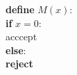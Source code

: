   \hspace*{0.0em} \textbf{define} $M(x)$:
\\\hspace*{1.5em}   \textbf{if} $x = 0$:
\\\hspace*{3.0em}     acccept
\\\hspace*{1.5em}   \textbf{else}:
\\\hspace*{3.0em}     \textbf{reject}
